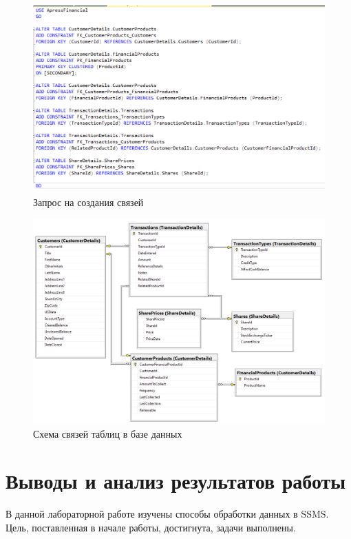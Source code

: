 \documentclass[a4paper, 14pt]{extarticle}
\begin{document}
\begin{figure}[H]
  \centering
  \includegraphics[width=\textwidth]{images/task-4/1.png}
  \caption{Запрос на создания связей}
  \label{fig:task-4-1}
\end{figure}

\begin{figure}[H]
  \centering
  \includegraphics[width=\textwidth]{images/task-4/2.png}
  \caption{Схема связей таблиц в базе данных}
  \label{fig:task-4-2}
\end{figure}

\section{Выводы и анализ результатов работы}

В данной лабораторной работе изучены способы обработки данных в SSMS. Цель,
поставленная в начале работы, достигнута, задачи выполнены.
\end{document}
